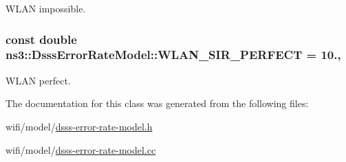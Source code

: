 W\+L\+AN impossible. 

\subsubsection[{\texorpdfstring{W\+L\+A\+N\+\_\+\+S\+I\+R\+\_\+\+P\+E\+R\+F\+E\+CT}{WLAN_SIR_PERFECT}}]{\setlength{\rightskip}{0pt plus 5cm}const double ns3\+::\+Dsss\+Error\+Rate\+Model\+::\+W\+L\+A\+N\+\_\+\+S\+I\+R\+\_\+\+P\+E\+R\+F\+E\+CT = 10.\hspace{0.3cm}{\ttfamily [static]}, {\ttfamily [protected]}}\hypertarget{classns3_1_1DsssErrorRateModel_a30cb6e7959e79909c2ca9ce7170e7fc1}{}\label{classns3_1_1DsssErrorRateModel_a30cb6e7959e79909c2ca9ce7170e7fc1}


W\+L\+AN perfect. 



The documentation for this class was generated from the following files\+:\begin{DoxyCompactItemize}
\item 
wifi/model/\hyperlink{dsss-error-rate-model_8h}{dsss-\/error-\/rate-\/model.\+h}\item 
wifi/model/\hyperlink{dsss-error-rate-model_8cc}{dsss-\/error-\/rate-\/model.\+cc}\end{DoxyCompactItemize}

